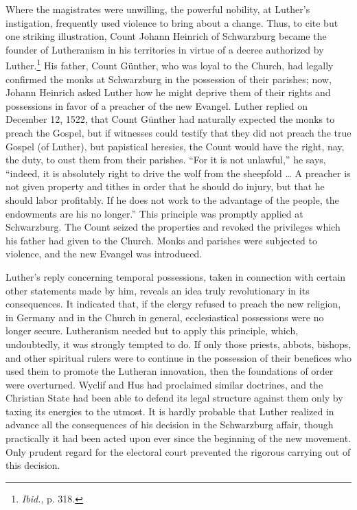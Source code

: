 Where the magistrates were unwilling, the powerful nobility, at
Luther’s instigation, frequently used violence to bring about a change.
Thus, to cite but one striking illustration, Count Johann Heinrich
of Schwarzburg became the founder of Lutheranism in his territories
in virtue of a decree authorized by Luther.\footnote{\textit{Ibid.}, p. 318.}
His father, Count Günther, who was loyal to the Church, had legally confirmed the
monks at Schwarzburg in the possession of their parishes; now, Johann
Heinrich asked Luther how he might deprive them of their rights
and possessions in favor of a preacher of the new Evangel. Luther
replied on December 12, 1522, that Count Günther had naturally
expected the monks to preach the Gospel, but if witnesses could
testify that they did not preach the true Gospel (of Luther), but
papistical heresies, the Count would have the right, nay, the duty, to
oust them from their parishes. “For it is not unlawful,” he says, “indeed,
it is absolutely right to drive the wolf from the sheepfold \dots
A preacher is not given property and tithes in order that he
should do injury, but that he should labor profitably. If he does not
work to the advantage of the people, the endowments are his no
longer.” This principle was promptly applied at Schwarzburg. The
Count seized the properties and revoked the privileges which his
father had given to the Church. Monks and parishes were subjected
to violence, and the new Evangel was introduced.

Luther’s reply concerning temporal possessions, taken in connection
with certain other statements made by him, reveals an idea truly
revolutionary in its consequences. It indicated that, if the clergy refused
to preach the new religion, in Germany and in the Church in
general, ecclesiastical possessions were no longer secure. Lutheranism
needed but to apply this principle, which, undoubtedly, it was
strongly tempted to do. If only those priests, abbots, bishops, and
other spiritual rulers were to continue in the possession of their benefices
who used them to promote the Lutheran innovation, then the
foundations of order were overturned. Wyclif and Hus had proclaimed similar
doctrines, and the Christian State had been able to defend its legal structure
against them only by taxing its energies to the utmost. It is hardly probable
that Luther realized in advance all the
consequences of his decision in the Schwarzburg affair, though practically
it had been acted upon ever since the beginning of the new
movement. Only prudent regard for the electoral court prevented
the rigorous carrying out of this decision.
